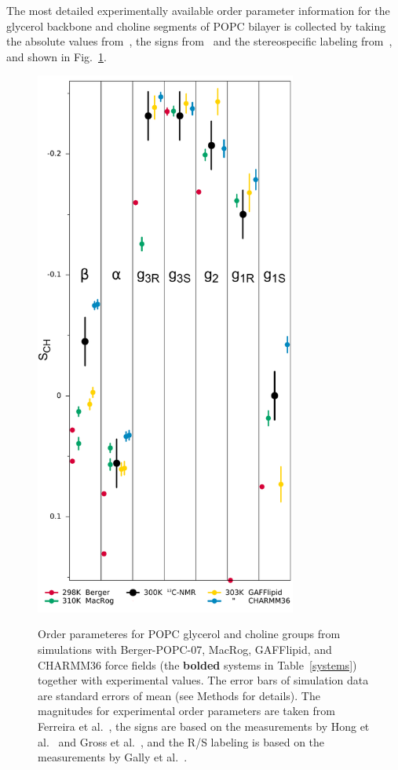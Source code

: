 \documentclass[journal=jacsat,manuscript=article]{achemso}
\begin{document}
The most detailed experimentally available order parameter information for the glycerol backbone and choline 
segments of POPC bilayer is collected by taking the absolute values from~\cite{ferreira13}, the signs from~\cite{hong95a,hong95b,gross97} 
and the stereospecific labeling from~\cite{gally81}, and shown in Fig.~\ref{HGorderparameters2}.
\begin{figure}[]
  \centering
  \includegraphics[width=8.6cm]{../Fig/stereospecificOPs.pdf} \\
  \caption{\label{HGorderparameters2}
  Order parameteres for POPC glycerol and choline groups
  from simulations with Berger-POPC-07, MacRog, GAFFlipid, and CHARMM36 force fields
  (the {\bf bolded} systems in Table~\ref{systems})
  together with experimental values.
  The error bars of simulation data are standard errors of mean (see Methods for details).
  The magnitudes for experimental order parameters are taken from Ferreira et al.~\cite{ferreira13},
  the signs are based on the measurements by Hong et al.~\cite{hong95a,hong95b} 
  and Gross et al.~\cite{gross97}, and the R/S labeling is based on the measurements by Gally et al.~\cite{gally81}.
}
\end{figure}
\end{document}
